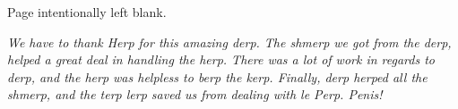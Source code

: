 \vspace*{\fill}
\begin{center}
Page intentionally left blank.
\end{center}
\vspace*{\fill}

\pagebreak

\vspace*{7cm}
\begin{center}

\emph{We have to thank Herp for this amazing derp. The shmerp we got from the derp, helped a great deal in handling the herp. There was a lot of work in regards to derp, and the herp was helpless to berp the kerp. Finally, derp herped all the shmerp, and the terp lerp saved us from dealing with le Perp. Penis!}

\end{center}